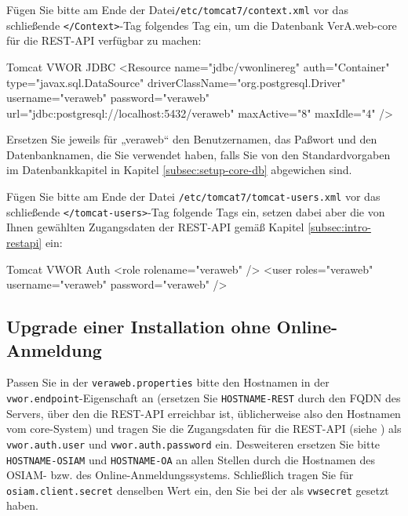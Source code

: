 \begin{minipage}{\textwidth}
Fügen Sie bitte am Ende der Datei\texttt{/etc/tomcat7/context.xml} vor
das schließende \texttt{</Context>}-Tag folgendes Tag ein, um die
 \ifupgradeanleitung
  Datenbank VerA.web-core
 \else%
 \fi%
für die REST-API verfügbar zu machen:

\begin{lstdump}[language=XML]{Tomcat VWOR JDBC}
<Resource name="jdbc/vwonlinereg" auth="Container" type="javax.sql.DataSource"
 driverClassName="org.postgresql.Driver" username="veraweb" password="veraweb"
 url="jdbc:postgresql://localhost:5432/veraweb" maxActive="8" maxIdle="4" />
\end{lstdump}

Ersetzen Sie jeweils für „veraweb“ den Benutzernamen, das Paßwort und den
Datenbanknamen, die Sie verwendet haben, falls Sie von den Standardvorgaben
 \ifupgradeanleitung
  im Datenbankkapitel
 \else%
  in Kapitel \ref{subsec:setup-core-db}
 \fi%
abgewichen sind.
\end{minipage}

\begin{minipage}{\textwidth}
Fügen Sie bitte am Ende der Datei \texttt{/etc/tomcat7/tomcat-users.xml} vor
das schließende \texttt{</tomcat-users>}-Tag folgende Tags ein, setzen dabei
aber die von Ihnen gewählten Zugangsdaten der REST-API gemäß Kapitel
\ref{subsec:intro-restapi} ein:

\begin{lstdump}[language=XML]{Tomcat VWOR Auth}
<role rolename="veraweb" />
<user roles="veraweb" username="veraweb" password="veraweb" />
\end{lstdump}
\end{minipage}

\ifoa\ifupgradeanleitung\else%

\subsection{Upgrade einer Installation ohne Online-Anmeldung}

Passen Sie in der \texttt{veraweb.properties} bitte den Hostnamen
in der \texttt{vwor.endpoint}-Eigenschaft an (ersetzen Sie
\texttt{HOSTNAME-REST} durch den FQDN des Servers, über den die
REST-API erreichbar ist, üblicherweise also den Hostnamen vom
core-System) und tragen Sie die Zugangsdaten für die REST-API
(siehe ) als \texttt{vwor.auth.user}
und \texttt{vwor.auth.password} ein.
Desweiteren ersetzen Sie bitte \texttt{HOSTNAME-OSIAM} und
\texttt{HOSTNAME-OA} an allen Stellen durch die Hostnamen
des OSIAM- bzw. des Online-Anmeldungssystems. Schließlich
tragen Sie für \texttt{osiam.client.secret} denselben Wert
ein, den Sie bei der 
als \texttt{vwsecret} gesetzt haben.

